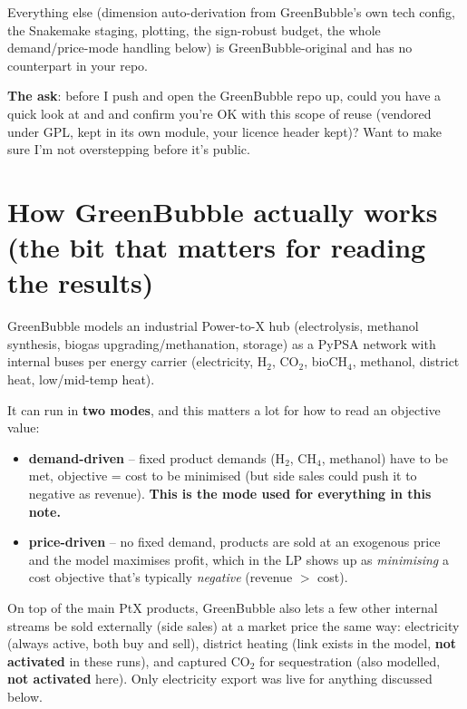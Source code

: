 \documentclass[11pt]{article}
\begin{document}
Everything else (dimension auto-derivation from GreenBubble's own tech
config, the Snakemake staging, plotting, the sign-robust budget, the whole
demand/price-mode handling below) is GreenBubble-original and has no
counterpart in your repo.

\textbf{The ask}: before I push  and open the
GreenBubble repo up, could you have a quick look at
 and
 and confirm you're OK
with this scope of reuse (vendored under GPL, kept in its own module, your
licence header kept)? Want to make sure I'm not overstepping before it's
public.

\section{How GreenBubble actually works (the bit that matters for reading the results)}
\label{sec:model}
GreenBubble models an industrial Power-to-X hub (electrolysis, methanol
synthesis, biogas upgrading/methanation, storage) as a PyPSA network with
internal buses per energy carrier (electricity, H$_2$, CO$_2$, bioCH$_4$,
methanol, district heat, low/mid-temp heat).

It can run in \textbf{two modes}, and this matters a lot for how to read an
objective value:
\begin{itemize}[leftmargin=1.4em]
  \item \textbf{demand-driven} -- fixed product demands (H$_2$, CH$_4$,
    methanol) have to be met, objective = cost to be minimised (but side sales could push it to negative as revenue).
    \textbf{This is the mode used for everything in this note.}
  \item \textbf{price-driven} -- no fixed demand, products are sold at an
    exogenous price and the model maximises profit, which in the LP shows
    up as \emph{minimising} a cost objective that's typically
    \emph{negative} (revenue $>$ cost).
\end{itemize}

On top of the main PtX products, GreenBubble also lets a few other
internal streams be sold externally (side sales) at a market price the same way:
electricity (always active, both buy and sell), district heating (link
exists in the model, \textbf{not activated} in these runs), and captured
CO$_2$ for sequestration (also modelled, \textbf{not activated} here).
Only electricity export was live for anything discussed below.
\end{document}
